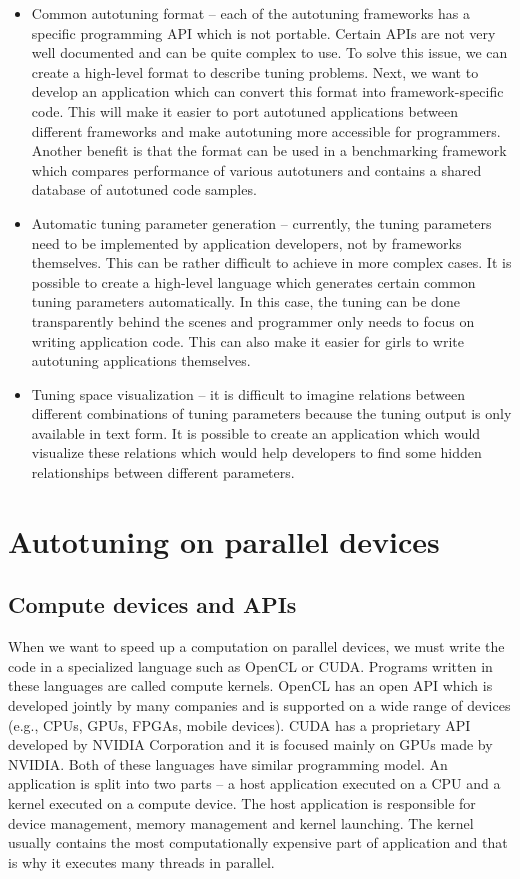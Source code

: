 \documentclass[
  digital,     %
  oneside,     %
  nosansbold,  %
  nocolorbold, %
  lof,         %
  lot,         %
]{fithesis4}
\begin{document}
\begin{itemize}
    \item Common autotuning format -- each of the autotuning frameworks has a specific programming API which is not portable. Certain APIs are not very well documented and can be quite complex to use. To solve this issue, we can create a high-level format to describe tuning problems. Next, we want to develop an application which can convert this format into framework-specific code. This will make it easier to port autotuned applications between different frameworks and make autotuning more accessible for programmers. Another benefit is that the format can be used in a benchmarking framework which compares performance of various autotuners and contains a shared database of autotuned code samples.
    \item Automatic tuning parameter generation -- currently, the tuning parameters need to be implemented by application developers, not by frameworks themselves. This can be rather difficult to achieve in more complex cases. It is possible to create a high-level language which generates certain common tuning parameters automatically. In this case, the tuning can be done transparently behind the scenes and programmer only needs to focus on writing application code. This can also make it easier for girls to write autotuning applications themselves. 
    \item Tuning space visualization -- it is difficult to imagine relations between different combinations of tuning parameters because the tuning output is only available in text form. It is possible to create an application which would visualize these relations which would help developers to find some hidden relationships between different parameters.
\end{itemize}

\chapter{Autotuning on parallel devices}

\section{Compute devices and APIs}
When we want to speed up a computation on parallel devices, we must write the code in a specialized language such as OpenCL or CUDA. Programs written in these languages are called compute kernels. OpenCL has an open API which is developed jointly by many companies and is supported on a wide range of devices (e.g., CPUs, GPUs, FPGAs, mobile devices). CUDA has a proprietary API developed by NVIDIA Corporation and it is focused mainly on GPUs made by NVIDIA. Both of these languages have similar programming model. An application is split into two parts -- a host application executed on a CPU and a kernel executed on a compute device. The host application is responsible for device management, memory management and kernel launching. The kernel usually contains the most computationally expensive part of application and that is why it executes many threads in parallel.
\end{document}
